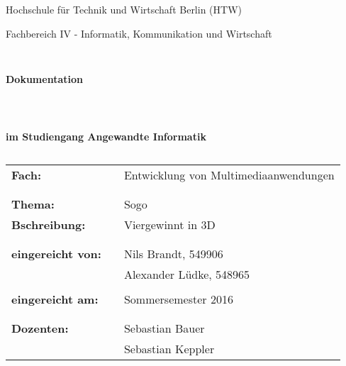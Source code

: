 \documentclass[a4paper]{scrartcl}
\begin{document}
\thispagestyle{empty}

%
%
\thispagestyle{empty}
\begin{center}
\Large{Hochschule für Technik und Wirtschaft Berlin (HTW)}\\
\end{center}
 
 
\begin{center}
\Large{Fachbereich IV - Informatik, Kommunikation und Wirtschaft}
\end{center}
\begin{verbatim}


\end{verbatim}
\begin{center}
\textbf{\LARGE{Dokumentation}}
\end{center}
\begin{verbatim}
 
 
\end{verbatim}
\begin{center}
\textbf{im Studiengang Angewandte Informatik}
\end{center}
\begin{verbatim}
\end{verbatim}
 
\begin{flushleft}
\begin{tabular}{lll}
\textbf{Fach:} & & Entwicklung von Multimediaanwendungen\\
& & \\
& & \\
\textbf{Thema:} & & Sogo\\
\textbf{Bschreibung:}& & Viergewinnt in 3D \\
& & \\
& & \\
\textbf{eingereicht von:} & & Nils Brandt, 549906 \\
& & Alexander Lüdke, 548965 \\
& & \\
\textbf{eingereicht am:} & &  Sommersemester 2016 \\
& & \\
& & \\
\textbf{Dozenten:} & & Sebastian Bauer \\
& & 	Sebastian Keppler
\end{tabular}
\end{flushleft}
\end{document}
